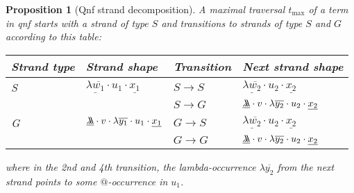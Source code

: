 \documentclass[xchauthor,chkrefs,GCNS,amsmath,amsthm,rotating,leaveRGB]{tcsg}
\theoremstyle{plain}
\newtheorem{proposition}[theorem]{Proposition}
\theoremstyle{definition}
\newcommand{\ghostlmd}{{\lambda\mkern-7mu \lambda}}
\begin{document}
\begin{proposition}[Qnf strand decomposition]\label{prop:qnf_strand_decomposition}
A maximal traversal $t_{\max }$ of a term in \emph{qnf} starts with a strand
of type $S$ and transitions to strands of type $S$ and $G$ according to this
table:
\begin{center}
{\footnotesize
\begin{tabular}{llll}
\hline
Strand type  & Strand shape & Transition & Next strand shape\\
\hline
{S}  & {$\underline{\lambda \overline{w_{1}}} \cdot u_{1} \cdot \underline{x_{1}} $} & $S \rightarrow S$ & $\underline{\lambda \overline{w_{2}}} \cdot u_{2} \cdot \underline{x_{2}}$  \\
    &    & $S \rightarrow G$    & $\underline{\ghostlmd } \cdot  v \cdot \lambda \overline{y_{2}} \cdot u_{2} \cdot \underline{x_{2}}$  \\[\tvspace{6pt}]
{G}    & {$\underline{\ghostlmd } \cdot  v \cdot \lambda \overline{y_{1}} \cdot u_{1} \cdot \underline{x_{1}}$}    & $G \rightarrow S$ & $\underline{\lambda \overline{w_{2}}} \cdot u_{2} \cdot \underline{x_{2}}$\\
    &    & $G \rightarrow G$    & $\underline{\ghostlmd } \cdot v \cdot \lambda \overline{y_{2}} \cdot u_{2} \cdot \underline{x_{2}}$\\
\hline
\end{tabular}}
\end{center}
where in the 2nd and 4th transition, the lambda-occurrence $\lambda
\overline{y_{2}}$ from the next strand points to some $@$-occurrence in
$u_{1}$.
\end{proposition}
%
\end{document}

